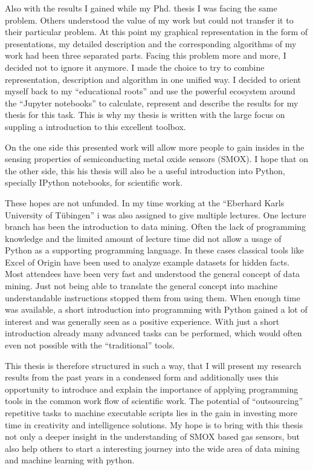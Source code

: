 \documentclass[11pt]{article}
\begin{document}
Also with the results I gained while my Phd. thesis I was facing the
same problem. Others understood the value of my work but could not
transfer it to their particular problem. At this point my graphical
representation in the form of presentations, my detailed description and
the corresponding algorithms of my work had been three separated parts.
Facing this problem more and more, I decided not to ignore it anymore. I
made the choice to try to combine representation, description and
algorithm in one unified way. I decided to orient myself back to my
``educational roots'' and use the powerful ecosystem around the
``Jupyter notebooks'' to calculate, represent and describe the results
for my thesis for this task. This is why my thesis is written with the
large focus on suppling a introduction to this excellent toolbox.

On the one side this presented work will allow more people to gain
insides in the sensing properties of semiconducting metal oxide sensors
(SMOX). I hope that on the other side, this his thesis will also be a
useful introduction into Python, specially IPython notebooks, for
scientific work.

These hopes are not unfunded. In my time working at the ``Eberhard Karls
University of Tübingen'' i was also assigned to give multiple lectures.
One lecture branch has been the introduction to data mining. Often the
lack of programming knowledge and the limited amount of lecture time did
not allow a usage of Python as a supporting programming language. In
these cases classical tools like Excel of Origin have been used to
analyze example datasets for hidden facts. Most attendees have been very
fast and understood the general concept of data mining. Just not being
able to translate the general concept into machine understandable
instructions stopped them from using them. When enough time was
available, a short introduction into programming with Python gained a
lot of interest and was generally seen as a positive experience. With
just a short introduction already many advanced tasks can be performed,
which would often even not possible with the ``traditional'' tools.

This thesis is therefore structured in such a way, that I will present
my research results from the past years in a condensed form and
additionally uses this opportunity to introduce and explain the
importance of applying programming tools in the common work flow of
scientific work. The potential of ``outsourcing'' repetitive tasks to
machine executable scripts lies in the gain in investing more time in
creativity and intelligence solutions. My hope is to bring with this
thesis not only a deeper insight in the understanding of SMOX based gas
sensors, but also help others to start a interesting journey into the
wide area of data mining and machine learning with python.
\end{document}
